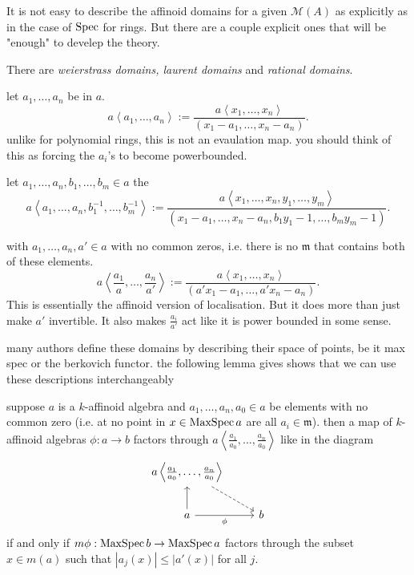 It is not easy to describe the affinoid domains for a given $\mathcal{M} (A)$ as explicitly as in the case of $\operatorname{Spec}$ for rings. 
But there are a couple explicit ones that will be "enough" to develep the theory. 
\begin{definition}
		There are \emph{weierstrass domains, laurent domains} and \emph{rational domains}. 
	\begin{description}
		\item[Weierstrass domain] let $a_1, \ldots, a_n$ be in $a$. 
			\[
				a\left<a_1, \ldots, a_n \right> := \frac{a\left<x_1, \ldots, x_n \right>}{(x_1-a_1, \ldots, x_n - a_n)}
			.\] 
			unlike for polynomial rings, this is not an evaulation map. you should think of this as forcing the $a_i$'s to become powerbounded. 
		\item [Laurent domains]
			let $a_1, \ldots, a_n, b_1, \ldots, b_m \in a$ the \[
				a\left<a_1, \ldots, a_n, b_1^{-1}, \ldots, b_m^{-1} \right> := \frac{a\left<x_1, \ldots, x_n,y_1, \ldots, y_m  \right>}{(x_1 - a_1, \ldots, x_n - a_n, b_1 y_1 - 1, \ldots, b_m y_m - 1)}
			.\] 
		\item[Rational domain] with $a_1, \ldots, a_n, a' \in a$ with no common zeros, i.e. there is no $\mathfrak{m} $ that contains both of these elements.   
			\[
				a \left<\frac{a_1}{a}, \ldots, \frac{a_n}{a'} \right> := \frac{a\left<x_1, \ldots, x_n \right>}{(a' x_1 - a_1, \ldots, a' x_n - a_n)}
			.\] 
			This is essentially the affinoid version of localisation.
			But it does more than just make $a'$ invertible. 
			It also makes $\frac{a_i}{ a'}$ act like it is power bounded in some sense. 
		\item 
	\end{description}

\end{definition}
many authors define these domains by describing their space of points, be it max spec or the berkovich functor. 
the following lemma gives shows that we can use these descriptions interchangeably
\begin{lemma}
	suppose $a$ is a $k$-affinoid algebra and $a_1, \ldots, a_n, a_0 \in a$ be elements with no common zero (i.e. at no point in $ x \in \operatorname{MaxSpec} a$ are all $a_{i} \in \mathfrak{m}$).
	 then a map of $k$-affinoid algebras $\phi: a \to b$ factors through $a \left<\frac{a_1}{a_0}, \ldots, \frac{a_n}{a_0} \right>$ like in the diagram \[
	 \begin{tikzcd}
		 a \left<\frac{a_1}{a_0}, \ldots, \frac{a_n}{a_0} \right> \drar[dashed]  \\
		 a \uar \rar[']{\phi} & b
	 \end{tikzcd}
	 \] 
	 if and only if  $m\phi: \operatorname{MaxSpec} b \to \operatorname{MaxSpec} a$ factors through the subset $x \in m(a)$ such that $|a_j(x)| \le |a'(x)|$ for all $j$. 
\end{lemma}

